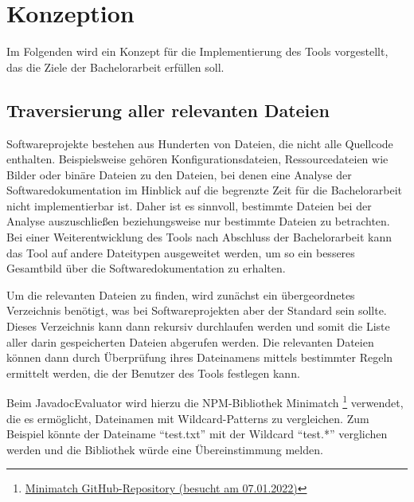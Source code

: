 \chapter{Konzeption}\label{chapter_conception}
Im Folgenden wird ein Konzept für die Implementierung des Tools vorgestellt, das  die Ziele der Bachelorarbeit erfüllen soll.
\section{Traversierung aller relevanten Dateien}\label{chapter:traversing}
Softwareprojekte bestehen aus Hunderten von Dateien, die nicht alle Quellcode enthalten. Beispielsweise gehören Konfigurationsdateien, Ressourcedateien wie Bilder oder binäre Dateien zu den Dateien, bei denen eine Analyse der Softwaredokumentation im Hinblick auf die begrenzte Zeit für die Bachelorarbeit nicht implementierbar ist. Daher ist es sinnvoll, bestimmte Dateien bei der Analyse auszuschließen beziehungsweise nur bestimmte Dateien zu betrachten. Bei einer Weiterentwicklung des Tools nach Abschluss der Bachelorarbeit kann das Tool auf andere Dateitypen ausgeweitet werden, um so ein besseres Gesamtbild über die Softwaredokumentation zu erhalten.

Um die relevanten Dateien zu finden, wird zunächst ein übergeordnetes Verzeichnis benötigt, was bei Softwareprojekten aber der Standard sein sollte. Dieses Verzeichnis kann dann rekursiv durchlaufen werden und somit die Liste aller darin gespeicherten Dateien abgerufen werden. Die relevanten Dateien können dann durch Überprüfung ihres Dateinamens mittels bestimmter Regeln ermittelt werden, die der Benutzer des Tools festlegen kann.

Beim JavadocEvaluator wird hierzu die NPM-Bibliothek Minimatch \footnote{\href{https://github.com/isaacs/minimatch}{Minimatch GitHub-Repository (besucht am 07.01.2022)}} verwendet, die es ermöglicht, Dateinamen mit Wildcard-Patterns zu vergleichen. Zum Beispiel könnte der Dateiname \enquote{test.txt} mit der Wildcard \enquote{test.*} verglichen werden und die Bibliothek würde eine Übereinstimmung melden.

